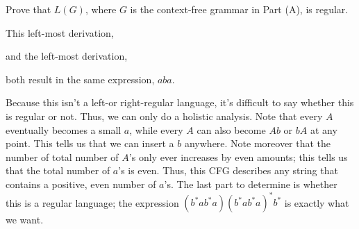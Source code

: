 \documentclass[solution, letterpaper]{cs121}
\begin{document}
\subproblem
Prove that $L(G)$,
where $G$ is the context-free grammar in Part (A), is regular.


\begin{solution}
\subsolution This left-most derivation,

\begin{center}
\end{center}

and the left-most derivation,

\begin{center}
\end{center}

\end{solution}

both result in the same expression, $aba$.

\subsolution Because this isn't a left-or right-regular language, it's difficult to say whether this is regular or not.  Thus, we can only do a holistic analysis.  Note that every $A$ eventually becomes a small $a$, while every $A$ can also become $Ab$ or $bA$ at any point.  This tells us that we can insert a $b$ anywhere.  Note moreover that the number of total number of $A$'s only ever increases by even amounts; this tells us that the total number of $a$'s is even.  Thus, this CFG describes any string that contains a positive, even number of $a$'s.  The last part to determine is whether this is a regular language; the expression $(b^*ab^*a)(b^*ab^*a)^*b^*$ is exactly what we want.
\end{document}
